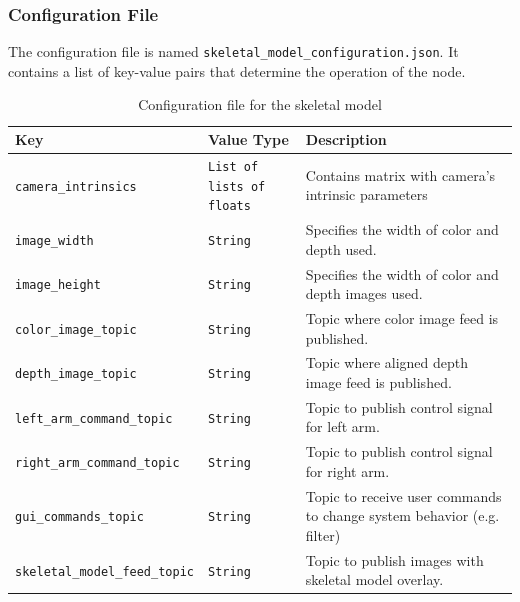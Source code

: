 \documentclass{CSSRforAfrica}
\begin{document}
\subsubsection*{Configuration File}
The configuration file is named \texttt{skeletal\_model\_configuration.json}. It contains a list of key-value pairs that determine the operation of the node. 

\begin{longtable}[c]{|l|l|p{5cm}|}
    \caption{Configuration file for the skeletal model} \label{tab:config_file}\\
    \hline
    \rowcolor{gray!30}
    \small{\textbf{Key}} & \small{\textbf{Value Type}} & \small{\textbf{Description}} \\ \hline
    \endhead %
    
    \small{\texttt{camera\_intrinsics}} & \small{\texttt{List of lists of floats}}  & \small{Contains matrix with camera's intrinsic parameters} \\ \hline
    \small{\texttt{image\_width}} & \small{\texttt{String}} & \small{Specifies the width of color and depth used.} \\ \hline
    \small{\texttt{image\_height}} & \small{\texttt{String}} & \small{Specifies the width of color and depth images used.} \\ \hline
    \small{\texttt{color\_image\_topic}} & \small{\texttt{String}} & \small{Topic where color image feed is published. } \\ \hline
    \small{\texttt{depth\_image\_topic}} & \small{\texttt{String}}& \small{Topic where aligned depth image feed is published. } \\ \hline
    \small{\texttt{left\_arm\_command\_topic}} & \small{\texttt{String}} & \small{Topic to publish control signal for left arm.} \\ \hline
    \small{\texttt{right\_arm\_command\_topic}} & \small{\texttt{String}} & \small{Topic to publish control signal for right arm.} \\ \hline
    \small{\texttt{gui\_commands\_topic}} & \small{\texttt{String}} & \small{Topic to receive user commands to change system behavior (e.g. filter)} \\ \hline
    \small{\texttt{skeletal\_model\_feed\_topic}} & \small{\texttt{String}} & \small{Topic to publish images with skeletal model overlay.} \\ \hline
\end{longtable}
\end{document}

